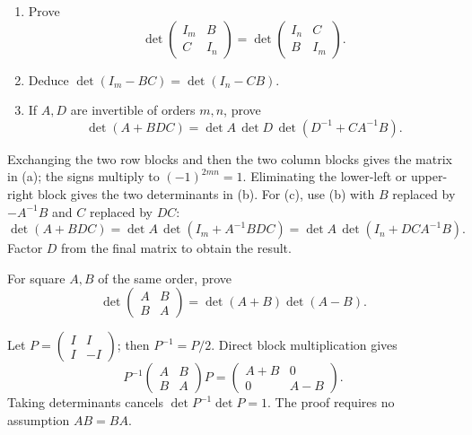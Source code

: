 \begin{problem}\label{ex:07:update}
\begin{enumerate}
\item Prove
\[
 \det\begin{pmatrix}I_m&B\\C&I_n\end{pmatrix}
 =\det\begin{pmatrix}I_n&C\\B&I_m\end{pmatrix}.
\]
\item Deduce \(\det(I_m-BC)=\det(I_n-CB)\).
\item If \(A,D\) are invertible of orders \(m,n\), prove
\[
 \det(A+BDC)=\det A\,\det D\,\det(D^{-1}+CA^{-1}B).
\]
\end{enumerate}
\end{problem}
\begin{solution}
Exchanging the two row blocks and then the two column blocks gives the
matrix in (a); the signs multiply to \((-1)^{2mn}=1\).
Eliminating the lower-left or upper-right block gives the two determinants
in (b). For (c), use (b) with \(B\) replaced by \(-A^{-1}B\) and
\(C\) replaced by \(DC\):
\[
 \det(A+BDC)=\det A\,\det(I_m+A^{-1}BDC)
 =\det A\,\det(I_n+DCA^{-1}B).
\]
Factor \(D\) from the final matrix to obtain the result.
\end{solution}

\begin{problem}\label{ex:07:difference}
For square \(A,B\) of the same order, prove
\[
 \det\begin{pmatrix}A&B\\B&A\end{pmatrix}
 =\det(A+B)\det(A-B).
\]
\end{problem}
\begin{solution}
Let \(P=\begin{pmatrix}I&I\\I&-I\end{pmatrix}\); then \(P^{-1}=P/2\).
Direct block multiplication gives
\[
 P^{-1}\begin{pmatrix}A&B\\B&A\end{pmatrix}P
 =\begin{pmatrix}A+B&0\\0&A-B\end{pmatrix}.
\]
Taking determinants cancels \(\det P^{-1}\det P=1\).
The proof requires no assumption \(AB=BA\).
\end{solution}

